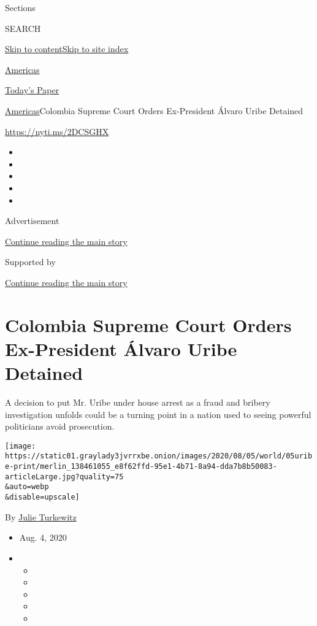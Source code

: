 Sections

SEARCH

\protect\hyperlink{site-content}{Skip to
content}\protect\hyperlink{site-index}{Skip to site index}

\href{https://www.nytimes3xbfgragh.onion/section/world/americas}{Americas}

\href{https://myaccount.nytimes3xbfgragh.onion/auth/login?response_type=cookie\&client_id=vi}{}

\href{https://www.nytimes3xbfgragh.onion/section/todayspaper}{Today's
Paper}

\href{/section/world/americas}{Americas}\textbar{}Colombia Supreme Court
Orders Ex-President Álvaro Uribe Detained

\url{https://nyti.ms/2DCSGHX}

\begin{itemize}
\item
\item
\item
\item
\item
\end{itemize}

Advertisement

\protect\hyperlink{after-top}{Continue reading the main story}

Supported by

\protect\hyperlink{after-sponsor}{Continue reading the main story}

\hypertarget{colombia-supreme-court-orders-ex-president-uxe1lvaro-uribe-detained}{%
\section{Colombia Supreme Court Orders Ex-President Álvaro Uribe
Detained}\label{colombia-supreme-court-orders-ex-president-uxe1lvaro-uribe-detained}}

A decision to put Mr. Uribe under house arrest as a fraud and bribery
investigation unfolds could be a turning point in a nation used to
seeing powerful politicians avoid prosecution.

\texttt{[image: https://static01.graylady3jvrrxbe.onion/images/2020/08/05/world/05uribe-print/merlin\_138461055\_e8f62ffd-95e1-4b71-8a94-dda7b8b50083-articleLarge.jpg?quality=75\\\&auto=webp\\\&disable=upscale]}

By \href{https://www.nytimes3xbfgragh.onion/by/julie-turkewitz}{Julie
Turkewitz}

\begin{itemize}
\item
  Aug. 4, 2020
\item
  \begin{itemize}
  \item
  \item
  \item
  \item
  \item
  \end{itemize}
\end{itemize}

